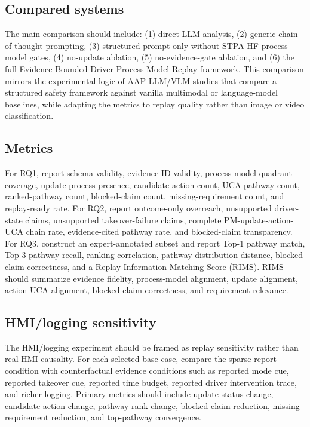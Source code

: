 \subsection{Compared systems}

The main comparison should include: (1) direct LLM analysis, (2) generic chain-of-thought prompting, (3) structured prompt only without STPA-HF process-model gates, (4) no-update ablation, (5) no-evidence-gate ablation, and (6) the full Evidence-Bounded Driver Process-Model Replay framework. This comparison mirrors the experimental logic of AAP LLM/VLM studies that compare a structured safety framework against vanilla multimodal or language-model baselines, while adapting the metrics to replay quality rather than image or video classification.

\subsection{Metrics}

For RQ1, report schema validity, evidence ID validity, process-model quadrant coverage, update-process presence, candidate-action count, UCA-pathway count, ranked-pathway count, blocked-claim count, missing-requirement count, and replay-ready rate. For RQ2, report outcome-only overreach, unsupported driver-state claims, unsupported takeover-failure claims, complete PM-update-action-UCA chain rate, evidence-cited pathway rate, and blocked-claim transparency. For RQ3, construct an expert-annotated subset and report Top-1 pathway match, Top-3 pathway recall, ranking correlation, pathway-distribution distance, blocked-claim correctness, and a Replay Information Matching Score (RIMS). RIMS should summarize evidence fidelity, process-model alignment, update alignment, action-UCA alignment, blocked-claim correctness, and requirement relevance.

\subsection{HMI/logging sensitivity}

The HMI/logging experiment should be framed as replay sensitivity rather than real HMI causality. For each selected base case, compare the sparse report condition with counterfactual evidence conditions such as reported mode cue, reported takeover cue, reported time budget, reported driver intervention trace, and richer logging. Primary metrics should include update-status change, candidate-action change, pathway-rank change, blocked-claim reduction, missing-requirement reduction, and top-pathway convergence.

